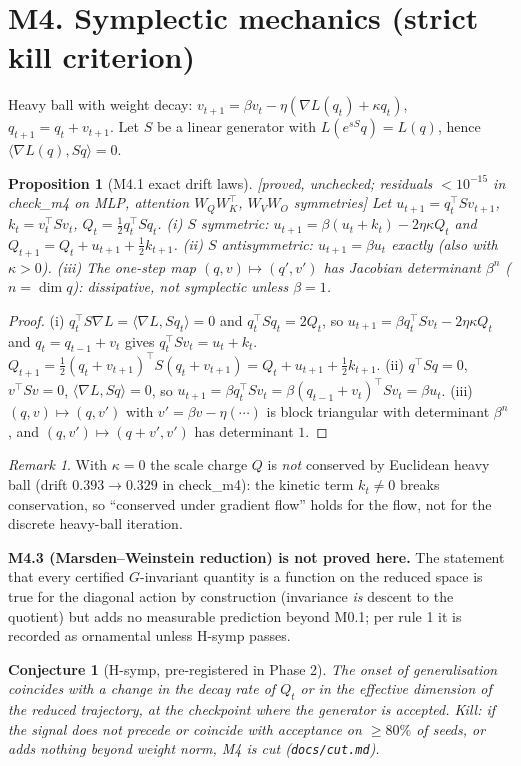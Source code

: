 \documentclass[11pt]{article}
\newtheorem{prop}{Proposition}
\newtheorem{conj}{Conjecture}
\theoremstyle{remark}\newtheorem{rem}{Remark}
\newcommand{\status}[1]{\hfill\textsf{[#1]}}
\begin{document}
\section*{M4. Symplectic mechanics (strict kill criterion)}
Heavy ball with weight decay: $v_{t+1}=\beta v_t-\eta(\nabla L(q_t)+\kappa q_t)$, $q_{t+1}=q_t+v_{t+1}$. Let $S$ be a linear generator with $L(e^{sS}q)=L(q)$, hence $\langle\nabla L(q),Sq\rangle=0$.
\begin{prop}[M4.1 exact drift laws]\status{proved, unchecked; residuals $<10^{-15}$ in check\_m4 on MLP, attention $W_QW_K^\top$, $W_VW_O$ symmetries}
Let $u_{t+1}=q_t^\top Sv_{t+1}$, $k_t=v_t^\top Sv_t$, $Q_t=\tfrac12q_t^\top Sq_t$.
(i) $S$ symmetric: $u_{t+1}=\beta(u_t+k_t)-2\eta\kappa Q_t$ and $Q_{t+1}=Q_t+u_{t+1}+\tfrac12k_{t+1}$.
(ii) $S$ antisymmetric: $u_{t+1}=\beta u_t$ exactly (also with $\kappa>0$).
(iii) The one-step map $(q,v)\mapsto(q',v')$ has Jacobian determinant $\beta^n$ ($n=\dim q$): dissipative, not symplectic unless $\beta=1$.
\end{prop}
\begin{proof}
(i) $q_t^\top S\nabla L=\langle\nabla L,Sq_t\rangle=0$ and $q_t^\top Sq_t=2Q_t$, so $u_{t+1}=\beta q_t^\top Sv_t-2\eta\kappa Q_t$ and $q_t=q_{t-1}+v_t$ gives $q_t^\top Sv_t=u_t+k_t$. $Q_{t+1}=\tfrac12(q_t+v_{t+1})^\top S(q_t+v_{t+1})=Q_t+u_{t+1}+\tfrac12k_{t+1}$. (ii) $q^\top Sq=0$, $v^\top Sv=0$, $\langle\nabla L,Sq\rangle=0$, so $u_{t+1}=\beta q_t^\top Sv_t=\beta(q_{t-1}+v_t)^\top Sv_t=\beta u_t$. (iii) $(q,v)\mapsto(q,v')$ with $v'=\beta v-\eta(\cdots)$ is block triangular with determinant $\beta^n$, and $(q,v')\mapsto(q+v',v')$ has determinant $1$. \qedhere
\end{proof}
\begin{rem}With $\kappa=0$ the scale charge $Q$ is \emph{not} conserved by Euclidean heavy ball (drift $0.393\to0.329$ in check\_m4): the kinetic term $k_t\ne0$ breaks conservation, so ``conserved under gradient flow'' holds for the flow, not for the discrete heavy-ball iteration.\end{rem}
\textbf{M4.3 (Marsden--Weinstein reduction) is not proved here.} The statement that every certified $G$-invariant quantity is a function on the reduced space is true for the diagonal action by construction (invariance \emph{is} descent to the quotient) but adds no measurable prediction beyond M0.1; per rule 1 it is recorded as ornamental unless H-symp passes.
\begin{conj}[H-symp, pre-registered in Phase 2]The onset of generalisation coincides with a change in the decay rate of $Q_t$ or in the effective dimension of the reduced trajectory, at the checkpoint where the generator is accepted. Kill: if the signal does not precede or coincide with acceptance on $\ge80\%$ of seeds, or adds nothing beyond weight norm, M4 is cut (\texttt{docs/cut.md}).\end{conj}
\end{document}
